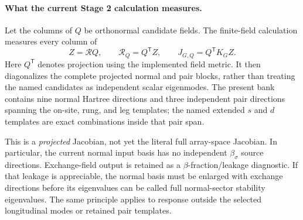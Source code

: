 \documentclass[11pt]{article}
\begin{document}
\paragraph{What the current Stage 2 calculation measures.}
Let the columns of \(Q\) be orthonormal candidate fields.  The finite-field
calculation measures every column of
\begin{equation}
 Z=\mathcal RQ,
 \qquad
 \mathcal R_Q=Q^{\mathsf T}Z,
 \qquad
 J_{G,Q}=Q^{\mathsf T}K_GZ.
 \label{eq:projected-stage2-response}
\end{equation}
Here \(Q^{\mathsf T}\) denotes projection using the implemented field metric.
It then diagonalizes the complete projected normal and pair blocks, rather than
treating the named candidates as independent scalar eigenmodes.  The present
bank contains nine normal Hartree directions and three independent pair
directions spanning the on-site, rung, and leg templates; the named extended
\(s\) and \(d\) templates are exact combinations inside that pair span.

This is a \emph{projected} Jacobian, not yet the literal full array-space
Jacobian.  In particular, the current normal input basis has no independent
\(\beta_\sigma\) source directions.  Exchange-field output is retained as a
\(\beta\)-fraction/leakage diagnostic.  If that leakage is appreciable, the
normal basis must be enlarged with exchange directions before its eigenvalues
can be called full normal-sector stability eigenvalues.  The same principle
applies to response outside the selected longitudinal modes or retained pair
templates.
\end{document}
